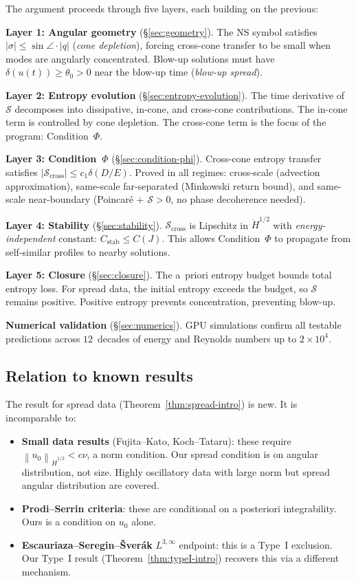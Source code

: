 \documentclass[11pt]{article}
\theoremstyle{definition}
\newcommand{\norm}[1]{\left\| #1 \right\|}
\newcommand{\Hdot}[1]{\dot{H}^{#1}}
\newcommand{\cS}{\mathcal{S}}
\begin{document}
The argument proceeds through five layers, each building
on the previous:

\medskip\noindent
\textbf{Layer 1: Angular geometry} (\S\ref{sec:geometry}).
The NS symbol satisfies $|\sigma| \leq \sin\angle \cdot |q|$
(\emph{cone depletion}), forcing cross-cone transfer to be
small when modes are angularly concentrated.  Blow-up
solutions must have $\delta(u(t)) \geq \theta_0 > 0$ near
the blow-up time (\emph{blow-up spread}).

\medskip\noindent
\textbf{Layer 2: Entropy evolution} (\S\ref{sec:entropy-evolution}).
The time derivative of $\cS$ decomposes into dissipative,
in-cone, and cross-cone contributions.  The in-cone term
is controlled by cone depletion.  The cross-cone term is
the focus of the program: Condition~$\Phi$.

\medskip\noindent
\textbf{Layer 3: Condition~$\Phi$}
(\S\ref{sec:condition-phi}).
Cross-cone entropy transfer satisfies
$|\cS_{\mathrm{cross}}| \leq c_1\delta(D/E)$.  Proved in
all regimes: cross-scale (advection approximation),
same-scale far-separated (Minkowski return bound), and
same-scale near-boundary (Poincar\'e + $\cS > 0$, no phase
decoherence needed).

\medskip\noindent
\textbf{Layer 4: Stability} (\S\ref{sec:stability}).
$\cS_{\mathrm{cross}}$ is Lipschitz in $\Hdot{1/2}$ with
\emph{energy-independent} constant: $C_{\mathrm{stab}}
\leq C(J)$.  This allows Condition~$\Phi$ to propagate from
self-similar profiles to nearby solutions.

\medskip\noindent
\textbf{Layer 5: Closure} (\S\ref{sec:closure}).
The a~priori entropy budget bounds total entropy loss.
For spread data, the initial entropy exceeds the budget,
so $\cS$ remains positive.  Positive entropy prevents
concentration, preventing blow-up.

\medskip\noindent
\textbf{Numerical validation} (\S\ref{sec:numerics}).
GPU simulations confirm all testable predictions across
$12$~decades of energy and Reynolds numbers up to
$2\times10^4$.


\subsection{Relation to known results}

The result for spread data
(Theorem~\ref{thm:spread-intro}) is new.  It is
incomparable to:
\begin{itemize}[leftmargin=2em]
\item \textbf{Small data results}
(Fujita--Kato, Koch--Tataru): these require
$\norm{u_0}_{\Hdot{1/2}} < c\nu$, a norm condition.
Our spread condition is on angular distribution,
not size.  Highly oscillatory data with large norm
but spread angular distribution are covered.
\item \textbf{Prodi--Serrin criteria}: these are
conditional on a posteriori integrability.  Ours is
a condition on $u_0$ alone.
\item \textbf{Escauriaza--Seregin--\v{S}ver\'ak}
$L^{3,\infty}$ endpoint: this is a Type~I exclusion.
Our Type~I result (Theorem~\ref{thm:typeI-intro})
recovers this via a different mechanism.
\end{itemize}
\end{document}

